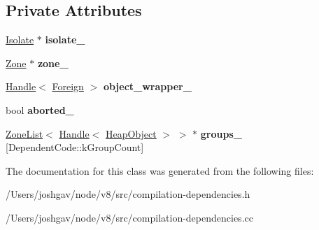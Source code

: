 \subsection*{Private Attributes}
\begin{DoxyCompactItemize}
\item 
\hyperlink{classv8_1_1internal_1_1_isolate}{Isolate} $\ast$ {\bfseries isolate\+\_\+}\hypertarget{classv8_1_1internal_1_1_compilation_dependencies_ae23d90c48bafe97c270d34674e41e22b}{}\label{classv8_1_1internal_1_1_compilation_dependencies_ae23d90c48bafe97c270d34674e41e22b}

\item 
\hyperlink{classv8_1_1internal_1_1_zone}{Zone} $\ast$ {\bfseries zone\+\_\+}\hypertarget{classv8_1_1internal_1_1_compilation_dependencies_a11de81ab48db4b95af1403605b7876ae}{}\label{classv8_1_1internal_1_1_compilation_dependencies_a11de81ab48db4b95af1403605b7876ae}

\item 
\hyperlink{classv8_1_1internal_1_1_handle}{Handle}$<$ \hyperlink{classv8_1_1internal_1_1_foreign}{Foreign} $>$ {\bfseries object\+\_\+wrapper\+\_\+}\hypertarget{classv8_1_1internal_1_1_compilation_dependencies_ad64265639015bac0a952fa7f746868a4}{}\label{classv8_1_1internal_1_1_compilation_dependencies_ad64265639015bac0a952fa7f746868a4}

\item 
bool {\bfseries aborted\+\_\+}\hypertarget{classv8_1_1internal_1_1_compilation_dependencies_aaa827ba57a28502ee726def8b7bbf08f}{}\label{classv8_1_1internal_1_1_compilation_dependencies_aaa827ba57a28502ee726def8b7bbf08f}

\item 
\hyperlink{classv8_1_1internal_1_1_zone_list}{Zone\+List}$<$ \hyperlink{classv8_1_1internal_1_1_handle}{Handle}$<$ \hyperlink{classv8_1_1internal_1_1_heap_object}{Heap\+Object} $>$ $>$ $\ast$ {\bfseries groups\+\_\+} \mbox{[}Dependent\+Code\+::k\+Group\+Count\mbox{]}\hypertarget{classv8_1_1internal_1_1_compilation_dependencies_afedfc90617ce42b79746e8f123058780}{}\label{classv8_1_1internal_1_1_compilation_dependencies_afedfc90617ce42b79746e8f123058780}

\end{DoxyCompactItemize}


The documentation for this class was generated from the following files\+:\begin{DoxyCompactItemize}
\item 
/\+Users/joshgav/node/v8/src/compilation-\/dependencies.\+h\item 
/\+Users/joshgav/node/v8/src/compilation-\/dependencies.\+cc\end{DoxyCompactItemize}
